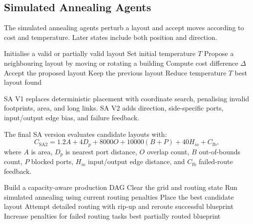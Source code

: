 \documentclass[11pt,a4paper]{article}
\begin{document}
\subsection{Simulated Annealing Agents}

The simulated annealing agents perturb a layout and accept moves according to cost and temperature. Later states include both position and direction.

\begin{algorithm}[H]
    \caption{Simulated annealing placement loop}
    \label{alg:sa}
    \begin{algorithmic}[1]
        \State Initialise a valid or partially valid layout
        \State Set initial temperature $T$
            \State Propose a neighbouring layout by moving or rotating a building
            \State Compute cost difference $\Delta$
                \State Accept the proposed layout
            \Else
                \State Keep the previous layout
            \EndIf
            \State Reduce temperature $T$
        \EndWhile
        \State \Return best layout found
    \end{algorithmic}
\end{algorithm}

SA V1 replaces deterministic placement with coordinate search, penalising invalid footprints, area, and long links. SA V2 adds direction, side-specific ports, input/output edge bias, and failure feedback.

The final SA version evaluates candidate layouts with:
\begin{equation}
C_{\mathrm{SA2}} = 1.2A + 4D_p + 8000O + 10000(B+P) + 40H_{io} + C_{\mathrm{fb}},
\end{equation}
where $A$ is area, $D_p$ is nearest port distance, $O$ overlap count, $B$ out-of-bounds count, $P$ blocked ports, $H_{io}$ input/output edge distance, and $C_{\mathrm{fb}}$ failed-route feedback.

\begin{algorithm}[H]
    \caption{Routing-aware simulated annealing with failure feedback}
    \label{alg:routing-aware-sa}
    \begin{algorithmic}[1]
        \State Build a capacity-aware production DAG
            \State Clear the grid and routing state
            \State Run simulated annealing using current routing penalties
            \State Place the best candidate layout
            \State Attempt detailed routing with rip-up and reroute
                \State \Return successful blueprint
            \Else
                \State Increase penalties for failed routing tasks
            \EndIf
        \EndFor
        \State \Return best partially routed blueprint
    \end{algorithmic}
\end{algorithm}
\end{document}
